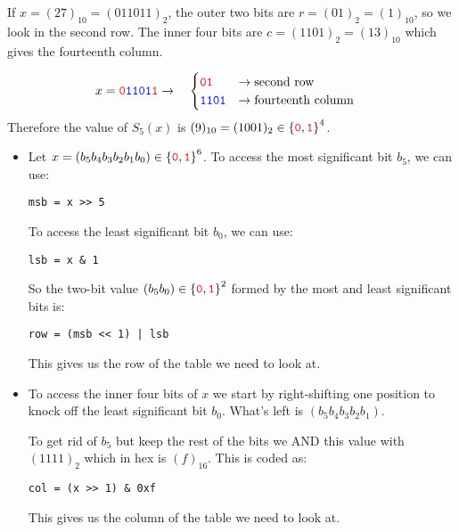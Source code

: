 \begin{example}
If $x = (27)_{10} = (011011)_2$, the outer two bits are $r = (01)_2 = (1)_{10}$, so we look in the second row. The inner four bits are $c = (1101)_2 = (13)_{10}$ which gives the fourteenth column.

\[
\begin{aligned}
	x &= \textcolor{red}{\texttt{0}}\textcolor{blue}{\texttt{1101}}\textcolor{red}{\texttt{1}} \rightarrow
	\quad \begin{cases}
		\textcolor{red}{\texttt{0}}\textcolor{red}{\texttt{1}} & \rightarrow \text{second row} \\
		\textcolor{blue}{\texttt{1101}} & \rightarrow \text{fourteenth column}
	\end{cases}
\end{aligned}
\]
Therefore the value of $S_5(x)$ is $(9)_{10} = (1001)_2 \in \set{\textcolor{red}{\texttt{0}},\textcolor{red}{\texttt{1}}}^4$.
\end{example}

\newpage
\begin{itemize}
	\item 
	Let $x = (b_5b_4b_3b_2b_1b_0) \in \set{\textcolor{red}{\texttt{0}},\textcolor{red}{\texttt{1}}}^6$.
	To access the most significant bit $b_5$, we can use: 
\begin{lstlisting}[style=C]
msb = x >> 5
\end{lstlisting}
\vspace{8pt}
	To access the least significant bit $b_0$, we can use: 
\begin{lstlisting}[style=C]
lsb = x & 1
\end{lstlisting}
\vspace{8pt}
	So the two-bit value $(b_5b_0) \in \set{\textcolor{red}{\texttt{0}},\textcolor{red}{\texttt{1}}}^2$ formed by the most and least significant bits is:
\begin{lstlisting}[style=C]
row = (msb << 1) | lsb
\end{lstlisting}
\vspace{8pt}
	This gives us the row of the table we need to look at.
	\vspace{20pt}
	\item To access the inner four bits of $x$ we start by right-shifting one position to knock off the least significant bit $b_0$. What's left is $(b_5b_4b_3b_2b_1)$.
	
	To get rid of $b_5$ but keep the rest of the bits we AND this value with $(1111)_2$ which in hex is $(f)_{16}$.
	This is coded as:
\begin{lstlisting}[style=C]
col = (x >> 1) & 0xf
\end{lstlisting}
This gives us the column of the table we need to look at.
\end{itemize}

